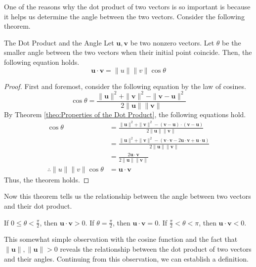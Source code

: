 \documentclass[../../../main.tex]{subfiles}
\begin{document}
One of the reasons why the dot product of two vectors is so important
is because it helps us determine the angle between the two vectors.
Consider the following theorem.

\begin{theorem}{}{The Dot Product and the Angle}
Let $\mathbf{u}, \mathbf{v}$ be two nonzero vectors. Let $\theta$ be
the smaller angle between the two vectors when their initial point
coincide. Then, the following equation holds.
\[
\mathbf{u} \cdot \mathbf{v}
= \| u \| \| v \| \cos\theta
\]
\end{theorem}
\begin{proof}
First and foremost, consider the following equation by the law of
cosines.
\[
\cos\theta
= \frac{ \| \mathbf{u} \|^2 + \| \mathbf{v} \|^2 -
    \| \mathbf{v} - \mathbf{u} \|^2
}{ 2 \| \mathbf{u} \| \| \mathbf{v} \| }
\]
By Theorem \ref{theo:Properties of the Dot Product}, the following
equations hold.
\begin{align*}
    \cos\theta
    &= \frac{ \| \mathbf{u} \|^2 + \| \mathbf{v} \|^2 -
        ( \mathbf{v} - \mathbf{u} ) \cdot ( \mathbf{v} - \mathbf{u} )
    }{ 2 \| \mathbf{u} \| \| \mathbf{v} \| } \\
    &= \frac{ \| \mathbf{u} \|^2 + \| \mathbf{v} \|^2 - \left(
        \mathbf{v} \cdot \mathbf{v}  - 2 \mathbf{u} \cdot \mathbf{v}
            + \mathbf{u} \cdot \mathbf{u}
        \right)
    }{ 2 \| \mathbf{u} \| \| \mathbf{v} \| } \\
    &= \frac{2 \mathbf{u} \cdot \mathbf{v}}
        { 2 \| \mathbf{u} \| \| \mathbf{v} \| } \\
    \therefore 
    \| u \| \| v \| \cos\theta
    &= \mathbf{u} \cdot \mathbf{v}
\end{align*}
Thus, the theorem holds.
\end{proof}

Now this theorem tells us the relationship between the angle between
two vectors and their dot product.

\begin{important}
If $0 \leq \theta < \frac{\pi}{2}$, then $\mathbf{u} \cdot \mathbf{v}
> 0$. If $\theta = \frac{\pi}{2}$, then $\mathbf{u} \cdot \mathbf{v}
= 0$. If $\frac{\pi}{2} < \theta < \pi$, then $\mathbf{u} \cdot
\mathbf{v} < 0$.
\end{important}

This somewhat simple observation with the cosine function and the
fact that $\| \mathbf{u} \|, \| \mathbf{u} \| > 0$ reveals the
relationship between the dot product of two vectors and their angles.
Continuing from this observation, we can establish a definition.
\end{document}
